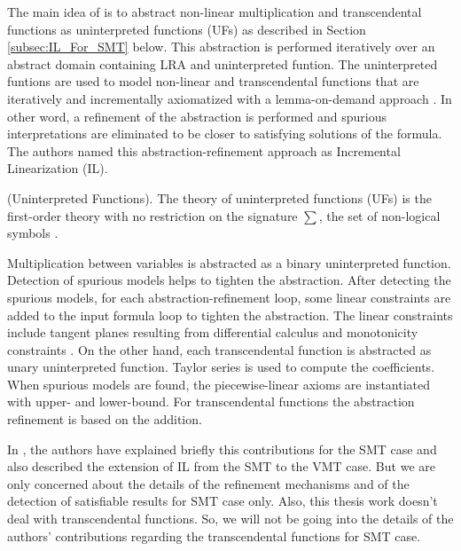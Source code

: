 \noindent The main idea of \cite{Cimatti:2018:ILS:3274693.3230639} is to abstract non-linear multiplication and transcendental functions as uninterpreted functions (UFs) as described in Section \ref{subsec:IL_For_SMT} below.
This abstraction is performed iteratively over an abstract domain containing LRA and uninterpreted funtion.
The uninterpreted funtions are used to model non-linear and transcendental functions that are iteratively and incrementally axiomatized with a lemma-on-demand approach \cite{Cimatti:2018:ILS:3274693.3230639}.
In other word, a refinement of the abstraction is performed and spurious interpretations are eliminated to be closer to satisfying solutions of the formula.
The authors named this abstraction-refinement approach as Incremental Linearization (IL).\newline

\begin{definition}
    (Uninterpreted Functions).
    The theory of uninterpreted functions (UFs) is the first-order theory with no restriction on the signature $\sum$, the set of non-logical symbols \cite{Cimatti:2018:ILS:3274693.3230639}.
 \end{definition}
 
\noindent Multiplication between variables is abstracted as a binary uninterpreted function.
Detection of spurious models helps to tighten the abstraction.
After detecting the spurious models, for each abstraction-refinement loop, some linear constraints are added to the input formula loop to tighten the abstraction.
The linear constraints include tangent planes resulting from differential calculus and monotonicity constraints \cite{Cimatti:2018:ILS:3274693.3230639}.
On the other hand, each transcendental function is abstracted as unary uninterpreted function.
Taylor series is used to compute the coefficients.
When spurious models are found, the  piecewise-linear axioms are instantiated with upper- and lower-bound.
For transcendental functions the abstraction refinement is based on the addition.\newline

\noindent In \cite{Cimatti:2018:ILS:3274693.3230639}, the authors have explained briefly this contributions for the SMT case and also described the extension of IL from the SMT to the VMT case. 
But we are only concerned about the details of the refinement mechanisms and of the detection of satisfiable results for SMT case only.
Also, this thesis work doesn't deal with transcendental functions.
So, we will not be going into the details of the authors' contributions regarding the transcendental functions for SMT case.

